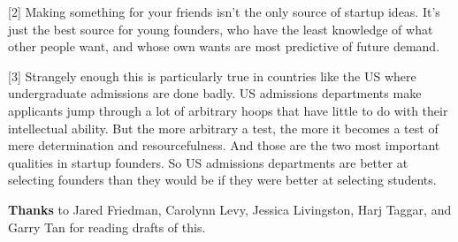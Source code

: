 [2] Making something for your friends isn't the only source of
                  startup ideas. It's just the best source for young founders,
                  who have the least knowledge of what other people want, and
                  whose own wants are most predictive of future demand.

[3] Strangely enough this is particularly true in countries
                  like the US where undergraduate admissions are done badly. US
                  admissions departments make applicants jump through a lot of
                  arbitrary hoops that have little to do with their intellectual
                  ability. But the more arbitrary a test, the more it becomes a
                  test of mere determination and resourcefulness. And those are
                  the two most important qualities in startup founders. So US
                  admissions departments are better at selecting founders than
                  they would be if they were better at selecting students.



\textbf{Thanks} to Jared Friedman, Carolynn Levy, Jessica
                    Livingston, Harj Taggar, and Garry Tan for reading drafts of
                    this.


              
            
          
            
              
                


                  
              
            
          
